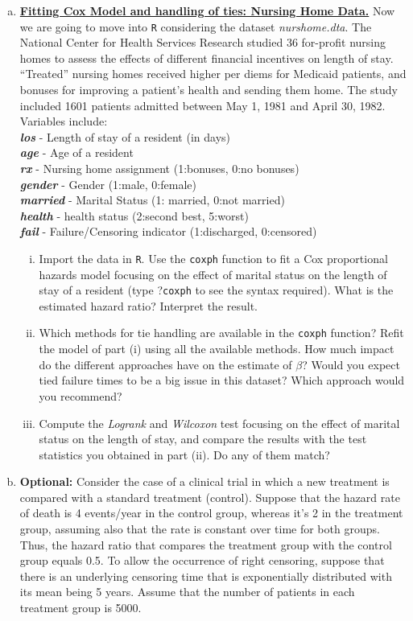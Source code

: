 \begin{enumerate}[(a)]
\item \textbf{\underline{Fitting Cox Model and handling of ties: Nursing Home Data.}} Now we are going to move into \verb|R| considering the dataset \emph{nurshome.dta}. The National Center for Health Services Research studied 36 for-profit nursing homes to assess the effects of different financial incentives on 
length of stay. “Treated” nursing homes received higher per diems for Medicaid 
patients, and bonuses for improving a patient's health and sending them home. 
The study included 1601 patients admitted between May 1, 1981 and April 30, 1982. \\
Variables include: \\
\textbf{\emph{los}} - Length of stay of a resident (in days) \\
\textbf{\emph{age}} - Age of a resident \\
\textbf{\emph{rx}} - Nursing home assignment (1:bonuses, 0:no bonuses) \\
\textbf{\emph{gender}} - Gender (1:male, 0:female) \\
\textbf{\emph{married}} - Marital Status (1: married, 0:not married) \\
\textbf{\emph{health}} - health status (2:second best, 5:worst) \\
\textbf{\emph{fail}} - Failure/Censoring indicator (1:discharged, 0:censored) 
\begin{enumerate}[(i)]
\item Import the data in \verb|R|. Use the \verb|coxph| function to fit a Cox proportional hazards model focusing on the effect of marital status on the length of stay of a resident (type ?\verb|coxph| to see the syntax required). What is the estimated hazard ratio? Interpret the result.
\item Which methods for tie handling are available in the \verb|coxph| function? Refit the model of part (i) using all the available methods. How much impact do the different approaches have on the estimate of $\beta$? Would you expect tied failure times to be a big issue in this dataset? Which 
approach would you recommend?
\item Compute the \emph{Logrank} and \emph{Wilcoxon} test focusing on the effect of marital status on the length of stay, and compare the results with the test statistics you obtained in part (ii). Do any of them match?
\end{enumerate}
\item \textbf{Optional:} Consider the case of a clinical trial in which a new treatment is compared with a standard treatment (control). Suppose that the hazard rate of death is 4 events/year in the control group, whereas it's 2 in the treatment group, assuming also that the rate is constant over time for both groups. Thus, the hazard ratio that compares the treatment group with the control group equals 0.5. To allow the occurrence of right censoring, suppose that there is an underlying censoring time that is exponentially distributed with its mean being 5 years. Assume that the number of patients in each treatment group is 5000.

\end{enumerate}
